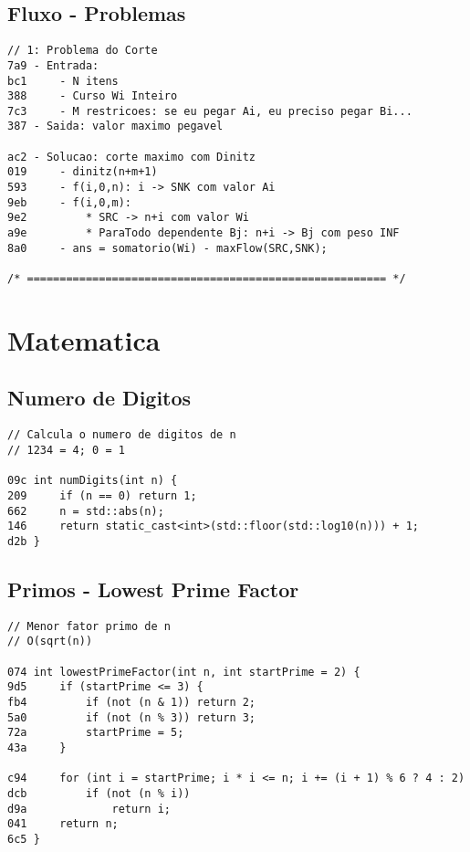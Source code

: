 \documentclass[11pt, a4paper, twoside]{article}
\begin{document}
\subsection{Fluxo - Problemas}
\begin{lstlisting}
// 1: Problema do Corte
7a9 - Entrada:
bc1 	- N itens
388 	- Curso Wi Inteiro
7c3 	- M restricoes: se eu pegar Ai, eu preciso pegar Bi...
387 - Saida: valor maximo pegavel

ac2 - Solucao: corte maximo com Dinitz
019 	- dinitz(n+m+1)
593 	- f(i,0,n): i -> SNK com valor Ai
9eb 	- f(i,0,m):
9e2 		* SRC -> n+i com valor Wi
a9e 		* ParaTodo dependente Bj: n+i -> Bj com peso INF
8a0 	- ans = somatorio(Wi) - maxFlow(SRC,SNK);

/* ======================================================= */
\end{lstlisting}



%
%

\section{Matematica}

\subsection{Numero de Digitos}
\begin{lstlisting}
// Calcula o numero de digitos de n 
// 1234 = 4; 0 = 1

09c int numDigits(int n) {
209     if (n == 0) return 1;
662     n = std::abs(n);
146     return static_cast<int>(std::floor(std::log10(n))) + 1;
d2b }
\end{lstlisting}

\subsection{Primos - Lowest Prime Factor}
\begin{lstlisting}
// Menor fator primo de n
// O(sqrt(n))

074 int lowestPrimeFactor(int n, int startPrime = 2) {
9d5     if (startPrime <= 3) {
fb4         if (not (n & 1)) return 2;
5a0         if (not (n % 3)) return 3;
72a         startPrime = 5;
43a     }
    
c94     for (int i = startPrime; i * i <= n; i += (i + 1) % 6 ? 4 : 2)
dcb         if (not (n % i))
d9a             return i;
041     return n;
6c5 }
\end{lstlisting}
\end{document}

